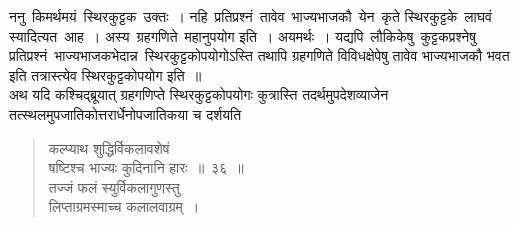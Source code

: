 \documentclass[11pt, openany]{book}
\begin{document}
\vspace{-3mm}
 ननु \,किमर्थमयं \,स्थिरकुट्टक \,उक्तः~। नहि \,प्रतिप्रश्नं \,तावेव \,भाज्यभाजकौ \,येन \,कृते स्थिरकुट्टके \,लाघवं स्यादित्यत \,आह~। अस्य \,ग्रहगणिते \,महानुपयोग इति~। अयमर्थः~। यद्यपि \,लौकिकेषु \,कुट्टकप्रश्नेषु \,प्रतिप्रश्नं \,भाज्यभाजकभेदान्न \,स्थिरकुट्टकोपयोगोऽस्ति तथापि ग्रहगणिते विविधक्षेपेषु तावेव भाज्यभाजकौ भवत इति तत्रास्त्येव स्थिरकुट्टकोपयोग इति~॥ \\

\vspace{-3mm}
 अथ यदि कश्चिद्ब्रूयात् ग्रहगणिप्ते स्थिरकुट्टकोपयोगः कुत्रास्ति 
तदर्थमुपदेशव्याजेन तत्स्थलमुपजातिकोत्तरार्धेनोपजातिकया च दर्शयति\textendash  

 \label{36}
\begin{quote}
    \bs
     कल्प्याथ शुद्धिर्विकलावशेषं \\

\vspace{-7mm}
\hspace{1cm} षष्टिश्च भाज्यः कुदिनानि हारः~॥~३६~॥ \\

 \vspace{-5mm}
 तज्जं फलं स्युर्विकलागुणस्तु \\

\vspace{-7mm}
\hspace{1cm} लिप्ताग्रमस्माच्च कलालवाग्रम्~।
\end{quote}
\end{document}
